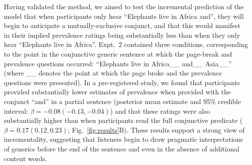 \documentclass[letterpaper, 12pt]{article}
\begin{document}




Having validated the method, we aimed to test the incremental prediction of the model that when participants only hear ``Elephants live in Africa and'', they will begin to anticipate a mutually-exclusive conjunct, and that this would manifest in their implied prevalence ratings being substantially less than when they only hear ``Elephants live in Africa''.
Expt.~2 contained three conditions, corresponding to the point in the conjunctive generic sentence at which the page-break and prevalence questions occurred: ``Elephants live in Africa\_\_ and\_\_ Asia\_\_'' (where \_\_ denotes the point at which the page broke and the prevalence questions were presented).
In a pre-registered study, we found that participants provided substantially lower estimates of prevalence when provided with the conjunct ``and'' in a partial sentence (posterior mean estimate and 95\% credible interval: $\beta = -0.08 (-0.13, -0.04)$) and that these ratings were also substantially higher than when participants read the full conjunctive predicate ($\beta = 0.17 (0.12, 0.23)$; Fig.~\ref{fig:results}B). 
These results support a strong view of incrementality, suggesting that listeners begin to draw pragmatic interpretations of generics before the end of the sentence and even in the absence of additional content words. 







\begingroup
\renewcommand{\section}[2]{}

\end{document}
